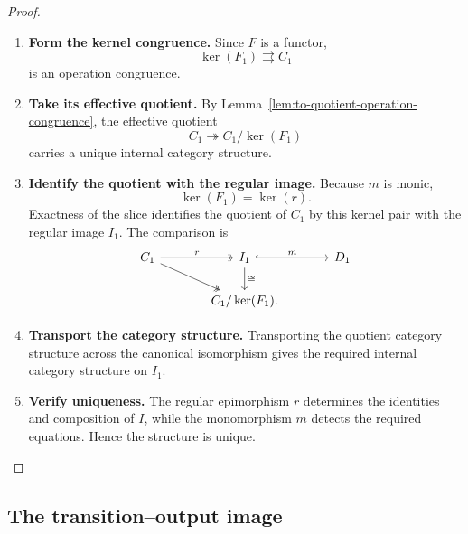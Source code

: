 \begin{proof}
    \leavevmode
    \begin{enumerate}
        \item \textbf{Form the kernel congruence.}
        Since \(F\) is a functor,
        \[
            \ker(F_1)\rightrightarrows C_1
        \]
        is an operation congruence.

        \item \textbf{Take its effective quotient.}
        By Lemma~\ref{lem:to-quotient-operation-congruence}, the effective
        quotient
        \[
            C_1\twoheadrightarrow C_1/\ker(F_1)
        \]
        carries a unique internal category structure.

        \item \textbf{Identify the quotient with the regular image.}
        Because \(m\) is monic,
        \[
            \ker(F_1)=\ker(r).
        \]
        Exactness of the slice identifies the quotient of \(C_1\) by this
        kernel pair with the regular image \(I_1\). The comparison is
        \[
        \begin{tikzcd}[column sep=large]
            C_1
                \arrow[r, two heads, "r"]
                \arrow[dr, two heads]
            &
            I_1
                \arrow[d, "\cong"]
                \arrow[r, hook, "m"]
            &
            D_1
            \\
            &
            C_1/\ker(F_1).
        \end{tikzcd}
        \]

        \item \textbf{Transport the category structure.}
        Transporting the quotient category structure across the canonical
        isomorphism gives the required internal category structure on \(I_1\).

        \item \textbf{Verify uniqueness.}
        The regular epimorphism \(r\) determines the identities and
        composition of \(I\), while the monomorphism \(m\) detects the
        required equations. Hence the structure is unique.
    \end{enumerate}
\end{proof}

\subsection{The transition--output image}
\label{subsec:to-transition-output-image}

